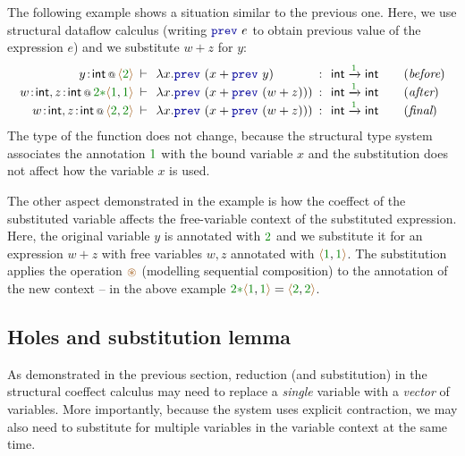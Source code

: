The following example shows a situation similar to the previous one. Here, we use
structural dataflow calculus (writing $\kvd{prev}~e$ to obtain previous value of the
expression $e$) and we substitute $w+z$ for $y$:
%
\begin{equation*}
\begin{array}{rclcll}
 \coctx{y\!:\!\ident{int}}{ \alift{\cclrd{2}} }
  &\narrow{\vdash}& \lambda x.\kvd{prev}~(x + \kvd{prev}~y) &\narrow{:}&
   \ident{int} \xrightarrow{\cclrd{ 1 }} \ident{int} & \quad(\textit{before}) \\
\coctx{w\!:\!\ident{int}, z\!:\!\ident{int}}{\cclrd{2}\cclrd{\ast}\alift{\cclrd{1},\cclrd{1}}}
  &\narrow{\vdash}& \lambda x.\kvd{prev}~(x + \kvd{prev}~(w+z))) &\narrow{:}&
   \ident{int} \xrightarrow{\cclrd{ 1 }} \ident{int} & \quad(\textit{after}) \\
\coctx{w\!:\!\ident{int}, z\!:\!\ident{int}}{\alift{\cclrd{2},\cclrd{2}}}
  &\narrow{\vdash}& \lambda x.\kvd{prev}~(x + \kvd{prev}~(w+z))) &\narrow{:}&
   \ident{int} \xrightarrow{\cclrd{ 1 }} \ident{int} & \quad(\textit{final})
\end{array}
\end{equation*}
%
The type of the function does not change, because the structural type system associates
the annotation $\cclrd{1}$ with the bound variable $x$ and the substitution does not
affect how the variable $x$ is used.

The other aspect demonstrated in the example is how the coeffect of the substituted
variable affects the free-variable context of the substituted expression. Here, the
original variable $y$ is annotated with $\cclrd{2}$ and we substitute it for an
expression $w+z$ with free variables $w,z$ annotated with $\alift{\cclrd{1}, \cclrd{1}}$.
The substitution applies the operation $\aseq$ (modelling sequential composition) to
the annotation of the new context -- in the above example
$\cclrd{2}\cclrd{\ast}\alift{\cclrd{1}, \cclrd{1}}=\alift{\cclrd{2}, \cclrd{2}}$.

\subsection{Holes and substitution lemma}
\label{sec:struct-syntactic-subst}

As demonstrated in the previous section, reduction (and substitution) in the structural coeffect
calculus may need to replace a \emph{single} variable with a \emph{vector} of variables.
More importantly, because the system uses explicit contraction, we may also need to substitute
for multiple variables in the variable context at the same time.

